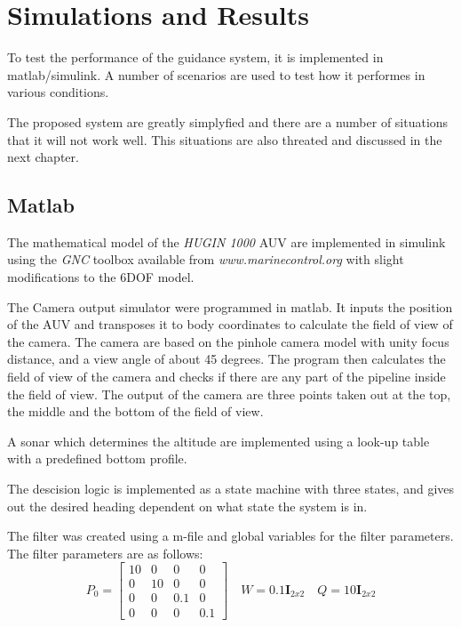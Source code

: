 \chapter{Simulations and Results}
	To test the performance of the guidance system, it is implemented in matlab/simulink. A number of
	scenarios are used to test how it performes in various conditions.

	The proposed system are greatly simplyfied and there are a number of situations that it will not work
	well. This situations are also threated and discussed in the next chapter. 
	

\section{Matlab}
	The mathematical model of the \textit{HUGIN 1000} AUV are implemented in simulink using the
	\textit{GNC} toolbox available from \textit{www.marinecontrol.org} with slight modifications to the
	6DOF model.

	The Camera output simulator were programmed in matlab. It inputs the position of the AUV and
	transposes it to body coordinates to calculate the field of view of the camera. The camera are based
	on the pinhole camera model with unity focus distance, and a view angle of about 45 degrees. The
	program then calculates the field of view of the camera and checks if there are any part of the
	pipeline inside the field of view. The output of the camera are three points taken out at the top, the
	middle and the bottom of the field of view.

	A sonar which determines the altitude are implemented using a look-up table with a predefined bottom
	profile.

	The descision logic is implemented as a state machine with three states, and gives out the 
	desired heading dependent on what state the system is in.

	The filter was created using a m-file and global variables for the filter parameters. The filter
	parameters are as follows:
	\begin{equation}
		P_0 = \left [ \begin{matrix}
				10 & 0 & 0 & 0 \\
				0 & 10 & 0 & 0 \\
				0 & 0 & 0.1 & 0 \\
				0 & 0 & 0 & 0.1
				\end{matrix} \right] \quad
		W = 0.1 \mathbf{I}_{2x2} \quad Q = 10 \mathbf{I}_{2x2} 
	\end{equation}

